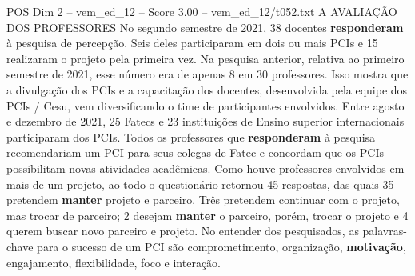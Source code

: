 \begin{textsample}{POS Dim 2 – vem\_ed\_12 – Score 3.00 – vem\_ed\_12/t052.txt}  \label{ex:f2_pos_107}
A AVALIAÇÃO DOS PROFESSORES No segundo semestre de 2021, 38 docentes \textbf{responderam} à pesquisa de percepção.
Seis deles participaram em dois ou mais PCIs e 15 realizaram o projeto pela primeira vez.
Na pesquisa anterior, relativa ao primeiro semestre de 2021, esse número era de apenas 8 em 30 professores.
Isso mostra que a divulgação dos PCIs e a capacitação dos docentes, desenvolvida pela equipe dos PCIs / Cesu, vem diversificando o time de participantes envolvidos.
Entre agosto e dezembro de 2021, 25 Fatecs e 23 instituições de Ensino superior internacionais participaram dos PCIs.
Todos os professores que \textbf{responderam} à pesquisa recomendariam um PCI para seus colegas de Fatec e concordam que os PCIs possibilitam novas atividades acadêmicas.
Como houve professores envolvidos em mais de um projeto, ao todo o questionário retornou 45 respostas, das quais 35 pretendem \textbf{manter} projeto e parceiro.
Três pretendem continuar com o projeto, mas trocar de parceiro; 2 desejam \textbf{manter} o parceiro, porém, trocar o projeto e 4 querem buscar novo parceiro e projeto.
No entender dos pesquisados, as palavras-chave para o sucesso de um PCI são comprometimento, organização, \textbf{motivação}, engajamento, flexibilidade, foco e interação.

\end{textsample}
